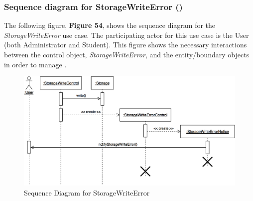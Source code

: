 \documentclass[12pt,letterpaper]{article}
\begin{document}
\subsubsection*{Sequence diagram for StorageWriteError (\storagewriteerror{})}

The following figure, {\bf Figure 54}, shows the sequence diagram for the {\it StorageWriteError} use case. The participating actor for this use case is
the User (both Administrator and Student). This figure shows the necessary interactions between the control object, {\it StorageWriteError}, and the
entity/boundary objects in order to manage \storagewriteerror{}.

\begin{figure}[H]
	\centering{}
	\includegraphics[scale=0.3]{imgs/seq/storage-write-error.png}
	\caption{Sequence Diagram for StorageWriteError}
\end{figure}
\end{document}
